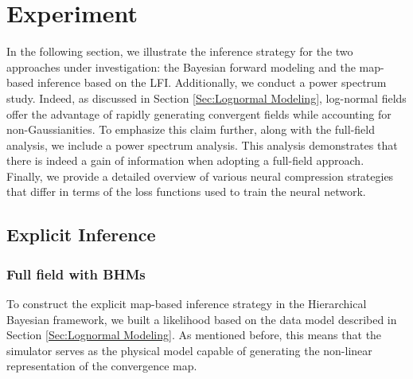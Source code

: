 \documentclass{aa}
\begin{document}
\section{Experiment}\label{Sec:experiment}
In the following section, we illustrate the inference strategy for the two approaches under investigation: the Bayesian forward modeling and the map-based inference based on the LFI.
Additionally, we conduct a power spectrum study. Indeed, as discussed in Section \ref{Sec:Lognormal Modeling}, log-normal fields offer the advantage of rapidly generating convergent fields while accounting for non-Gaussianities. To emphasize this claim further, along with the full-field analysis, we include a power spectrum analysis. This analysis demonstrates that there is indeed a gain of information when adopting a full-field approach. \\
Finally, we provide a detailed overview of various neural compression strategies that differ in terms of the loss functions used to train the neural network.
\subsection{Explicit Inference}
\subsubsection{Full field with BHMs}
To construct the explicit map-based inference strategy in the Hierarchical Bayesian framework, we built a likelihood based on the data model described in Section \ref{Sec:Lognormal Modeling}. 
As mentioned before, this means that the simulator serves as the physical model capable of generating the non-linear representation of the convergence map.
\end{document}
